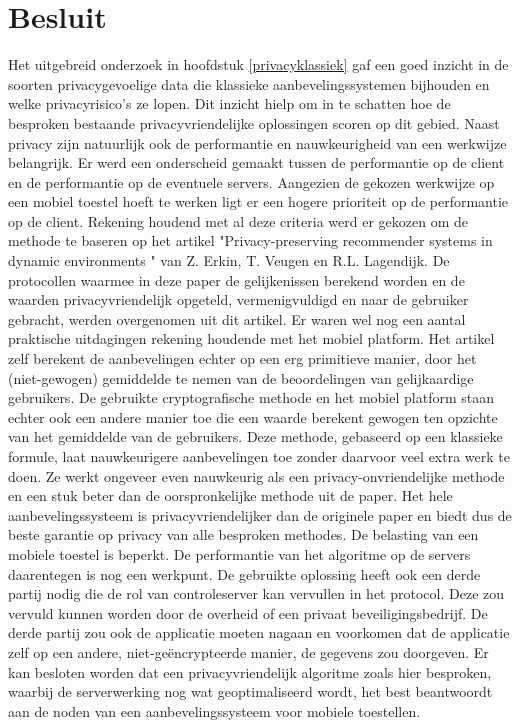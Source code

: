 \chapter{Besluit}


Het uitgebreid onderzoek in hoofdstuk \ref{privacyklassiek} gaf een goed inzicht in de soorten privacygevoelige data die klassieke aanbevelingssystemen bijhouden en welke privacyrisico's ze lopen. Dit inzicht hielp om in te schatten hoe de besproken bestaande privacyvriendelijke oplossingen scoren op dit gebied. Naast privacy zijn natuurlijk ook de performantie en nauwkeurigheid van een werkwijze belangrijk. Er werd een onderscheid gemaakt tussen de performantie op de client en de performantie op de eventuele servers. Aangezien de gekozen werkwijze op een mobiel toestel hoeft te werken ligt er een hogere prioriteit op de performantie op de client. Rekening houdend met al deze criteria werd er gekozen om de methode te baseren op het artikel "Privacy-preserving recommender systems in dynamic environments \cite{ZErkinDyn}" van Z. Erkin, T. Veugen en R.L. Lagendijk. De protocollen waarmee in deze paper de gelijkenissen berekend worden en de waarden privacyvriendelijk opgeteld, vermenigvuldigd en naar de gebruiker gebracht, werden overgenomen uit dit artikel. Er waren wel nog een aantal praktische uitdagingen rekening houdende met het mobiel platform. Het artikel zelf berekent de aanbevelingen echter op een erg primitieve manier, door het (niet-gewogen) gemiddelde te nemen van de beoordelingen van gelijkaardige gebruikers. De gebruikte cryptografische methode en het mobiel platform staan echter ook een andere manier toe die een waarde berekent gewogen ten opzichte van het gemiddelde van de gebruikers. Deze methode, gebaseerd op een klassieke formule, laat nauwkeurigere aanbevelingen toe zonder daarvoor veel extra werk te doen. Ze werkt ongeveer even nauwkeurig als een privacy-onvriendelijke methode en een stuk beter dan de oorspronkelijke methode uit de paper. Het hele aanbevelingssysteem is privacyvriendelijker dan de originele paper en biedt dus de beste garantie op privacy van alle besproken methodes. De belasting van een mobiele toestel is beperkt. De performantie van het algoritme op de servers daarentegen is nog een werkpunt. De gebruikte oplossing heeft ook een derde partij nodig die de rol van controleserver kan vervullen in het protocol. Deze zou vervuld kunnen worden door de overheid of een privaat beveiligingsbedrijf. De derde partij zou ook de applicatie moeten nagaan en voorkomen dat de applicatie zelf op een andere, niet-ge\"encrypteerde manier, de gegevens zou doorgeven. Er kan besloten worden dat een privacyvriendelijk algoritme zoals hier besproken, waarbij de serverwerking nog wat geoptimaliseerd wordt, het best beantwoordt aan de noden van een aanbevelingssysteem voor mobiele toestellen.